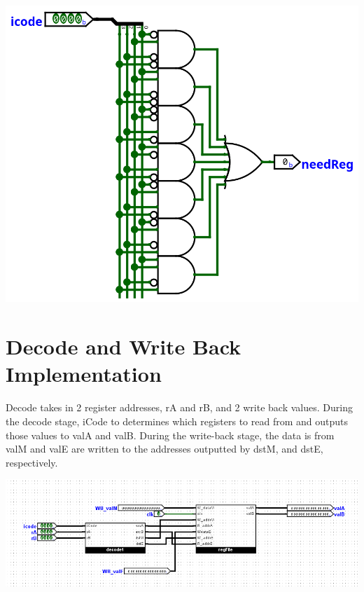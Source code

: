 \documentclass{article}
\begin{document}
\begin{center}
    \includegraphics[scale=.7]{needsReg.png}
\end{center}
\section{Decode and Write Back Implementation}
Decode takes in 2 register addresses, rA and rB, and 2 write back values. During the decode stage, iCode to determines which registers to read from and outputs those values to valA and valB. During the write-back stage, the data is from valM and valE are written to the addresses outputted by dstM, and dstE, respectively. 
\begin{center}
    \includegraphics[scale=.6]{decode.png} \\
\end{center}
\end{document}

